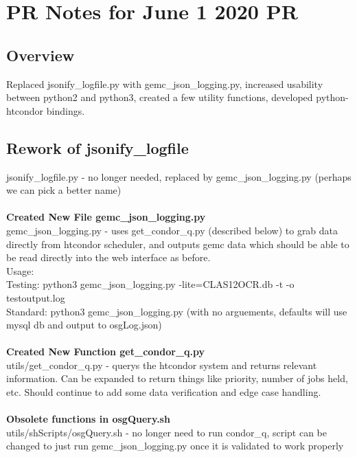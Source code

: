 \section{PR Notes for June 1 2020 PR}
    \subsection*{Overview}
        \indent Replaced jsonify\_logfile.py with gemc\_json\_logging.py, increased usability between python2 and python3, created a few utility functions, developed python-htcondor bindings. 
    
    \subsection{Rework of jsonify\_logfile}
        jsonify\_logfile.py - no longer needed, replaced by gemc\_json\_logging.py (perhaps we can pick a better name)\\
        ~\\
        \textbf{Created New File gemc\_json\_logging.py}\\
        gemc\_json\_logging.py - uses get\_condor\_q.py (described below) to grab data directly from htcondor scheduler, and outputs gemc data which should be able to be read directly into the web interface as before.\\
        Usage:\\
        Testing: python3 gemc\_json\_logging.py -lite=CLAS12OCR.db -t -o testoutput.log\\
        Standard: python3 gemc\_json\_logging.py (with no arguements, defaults will use mysql db and output to osgLog.json)\\
         ~\\
        \textbf{Created New Function get\_condor\_q.py}\\
        utils/get\_condor\_q.py - querys the htcondor system and returns relevant information. Can be expanded to return things like priority, number of jobs held, etc. Should continue to add some data verification and edge case handling.\\
        ~\\
        \textbf{Obsolete functions in osgQuery.sh}\\
        utils/shScripts/osgQuery.sh - no longer need to run condor\_q, script can be changed to just run gemc\_json\_logging.py once it is validated to work properly
        
